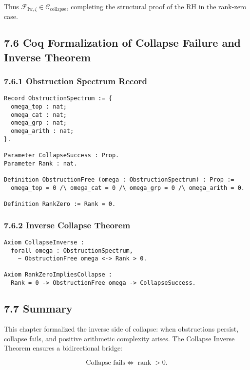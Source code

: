 \documentclass[11pt]{article}
\begin{document}
Thus \( \mathcal{F}_{\mathrm{Iw},\zeta} \in \mathcal{C}_{\mathrm{collapse}} \), completing the structural proof of the RH in the rank-zero case.

\subsection*{7.6 Coq Formalization of Collapse Failure and Inverse Theorem}

\subsubsection*{7.6.1 Obstruction Spectrum Record}

\begin{lstlisting}[language=Coq, caption=Obstruction Spectrum and Collapse Success, captionpos=b]
Record ObstructionSpectrum := {
  omega_top : nat;
  omega_cat : nat;
  omega_grp : nat;
  omega_arith : nat;
}.

Parameter CollapseSuccess : Prop.
Parameter Rank : nat.

Definition ObstructionFree (omega : ObstructionSpectrum) : Prop :=
  omega_top = 0 /\ omega_cat = 0 /\ omega_grp = 0 /\ omega_arith = 0.

Definition RankZero := Rank = 0.
\end{lstlisting}

\subsubsection*{7.6.2 Inverse Collapse Theorem}

\begin{lstlisting}[language=Coq, caption=Collapse Inverse Theorem, captionpos=b]
Axiom CollapseInverse :
  forall omega : ObstructionSpectrum,
    ~ ObstructionFree omega <-> Rank > 0.

Axiom RankZeroImpliesCollapse :
  Rank = 0 -> ObstructionFree omega -> CollapseSuccess.
\end{lstlisting}

\subsection*{7.7 Summary}

This chapter formalized the inverse side of collapse: when obstructions persist, collapse fails, and positive arithmetic complexity arises. The Collapse Inverse Theorem ensures a bidirectional bridge:

\[
\text{Collapse fails} \iff \operatorname{rank} > 0.
\]
\end{document}
